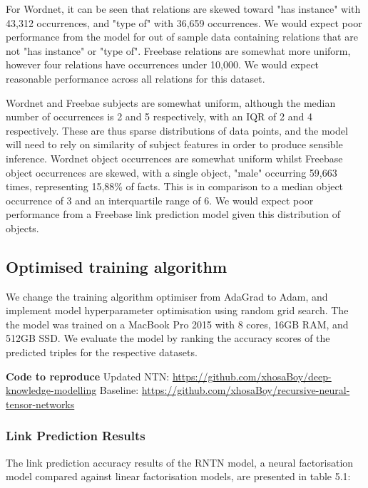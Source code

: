 \noindent For Wordnet, it can be seen that relations are skewed toward "has instance" with 43,312 occurrences, and "type of" with 36,659 occurrences. We would expect poor performance from the model for out of sample data containing relations that are not "has instance" or "type of". Freebase relations are somewhat more uniform, however four relations have occurrences under 10,000. We would expect reasonable performance across all relations for this dataset. \par

\noindent Wordnet and Freebae subjects are somewhat uniform, although the median number of occurrences is 2 and 5 respectively, with an IQR of 2 and 4 respectively. These are thus sparse distributions of data points, and the model will need to rely on  similarity of subject features in order to produce sensible inference. Wordnet object occurrences are somewhat uniform whilst Freebase object occurrences are skewed, with a single object, "male" occurring 59,663 times, representing 15,88\% of facts. This is in comparison to a median object occurrence of 3 and an interquartile range of 6. We would expect poor performance from a Freebase link prediction model given this distribution of objects. 



\subsection{Optimised training algorithm}

\noindent We change the training algorithm optimiser from AdaGrad to Adam, and implement model hyperparameter optimisation using random grid search. The the model was trained on a MacBook Pro 2015 with 8 cores, 16GB RAM, and 512GB SSD. We evaluate the model by ranking the accuracy scores of the predicted triples for the respective datasets. \bigskip

\noindent \textbf{Code to reproduce} \newline
Updated NTN:  \url{https://github.com/xhosaBoy/deep-knowledge-modelling} \newline
Baseline: \url{https://github.com/xhosaBoy/recursive-neural-tensor-networks}

\subsubsection{Link Prediction Results}
The link prediction accuracy results of the RNTN model, a neural factorisation model compared against linear factorisation models, are presented in table 5.1:

